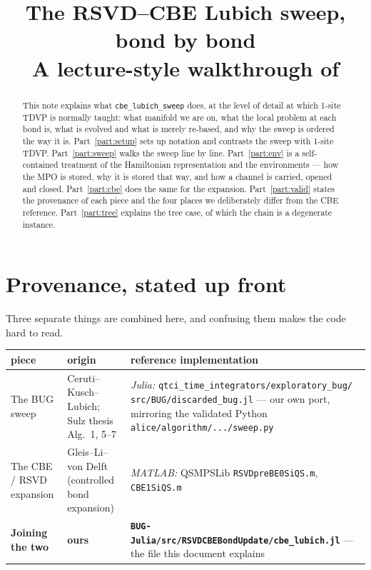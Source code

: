 \documentclass[11pt,a4paper]{article}
\title{\bf The RSVD--CBE Lubich sweep, bond by bond\\[2pt]
\large A lecture-style walkthrough of \code{cbe\_lubich\_sweep}}
\author{}
\date{}
\newcommand{\code}[1]{\texttt{\small #1}}
\begin{document}
\maketitle
\vspace{-2.2em}

\begin{abstract}
\noindent
This note explains what \code{cbe\_lubich\_sweep} does, at the level of detail at which 1-site
TDVP is normally taught: what manifold we are on, what the local problem at each bond is, what
is evolved and what is merely re-based, and why the sweep is ordered the way it is.
Part~\ref{part:setup} sets up notation and contrasts the sweep with 1-site TDVP.
Part~\ref{part:sweep} walks the sweep line by line. Part~\ref{part:env} is a self-contained
treatment of the Hamiltonian representation and the environments --- how the MPO is stored, why
it is stored that way, and how a channel is carried, opened and closed. Part~\ref{part:cbe}
does the same for the expansion. Part~\ref{part:valid} states the provenance of each piece and
the four places we deliberately differ from the CBE reference. Part~\ref{part:tree} explains
the tree case, of which the chain is a degenerate instance.
\end{abstract}

\tableofcontents

\section*{Provenance, stated up front}

Three separate things are combined here, and confusing them makes the code hard to read.

\begin{center}
\small
\begin{tabular}{@{}p{3.5cm}p{5.0cm}p{6.4cm}@{}}
\toprule
\textbf{piece} & \textbf{origin} & \textbf{reference implementation} \\
\midrule
The BUG sweep &
Ceruti--Kusch--Lubich; Sulz thesis Alg.\ 1, 5--7 &
\emph{Julia:} \code{qtci\_time\_integrators/exploratory\_bug/} \code{src/BUG/discarded\_bug.jl}
--- our own port, mirroring the validated Python \code{alice/algorithm/.../sweep.py} \\[2pt]
The CBE / RSVD expansion &
Gleis--Li--von Delft (controlled bond expansion) &
\emph{MATLAB:} QSMPSLib \code{RSVDpreBE0SiQS.m}, \code{CBE1SiQS.m} \\[2pt]
\textbf{Joining the two} &
\textbf{ours} &
\textbf{\code{BUG-Julia/src/RSVDCBEBondUpdate/cbe\_lubich.jl}} --- the file this document explains \\
\bottomrule
\end{tabular}
\end{center}
\end{document}
